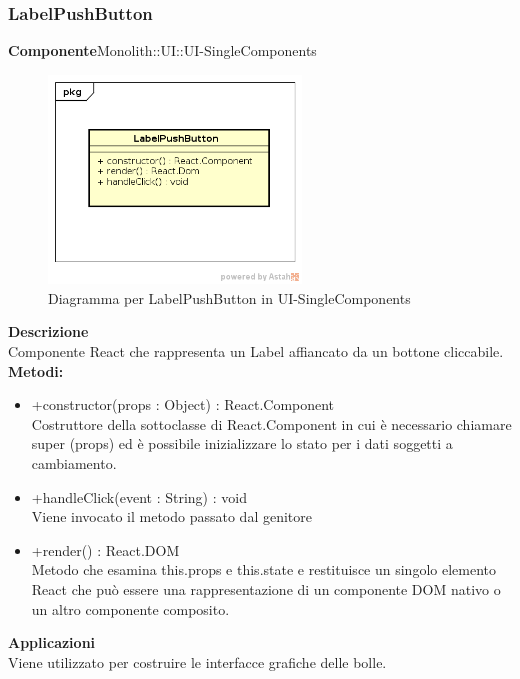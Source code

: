 \clearpage

\subsubsection{LabelPushButton}
\textbf{Componente}Monolith::UI::UI-SingleComponents\\
   \FloatBarrier
   \begin{figure}[ht]
   \centering
   \includegraphics[width=0.6\textwidth]{img/single-LabelPushButton}
   \caption{{Diagramma per LabelPushButton in UI-SingleComponents}}
\end{figure}
\FloatBarrier
\textbf{Descrizione}\\
Componente React che rappresenta un Label affiancato da un bottone cliccabile.
\textbf{Metodi:} \begin{itemize}\item +constructor(props : Object) : React.Component \\Costruttore della sottoclasse di React.Component in cui è necessario chiamare super (props) ed è possibile inizializzare lo stato per i dati soggetti a cambiamento.\item +handleClick(event : String) : void  \\Viene invocato il metodo passato dal genitore\item +render() : React.DOM \\Metodo che esamina this.props e this.state e restituisce un singolo elemento React che può essere una rappresentazione di un componente DOM nativo o un altro componente composito.\end{itemize} 


\textbf{Applicazioni}\\
Viene utilizzato per costruire le interfacce grafiche delle bolle. 


\clearpage

